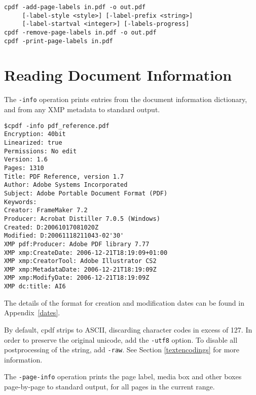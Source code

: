 \documentclass{book}
\begin{document}
\begin{framed}
    \vspace{1.5mm}
    \small\noindent\verb!cpdf -add-page-labels in.pdf -o out.pdf!\\
    \noindent\verb!     [-label-style <style>] [-label-prefix <string>]!\\
    \noindent\verb!     [-label-startval <integer>] [-labels-progress]!\\
    
    \vspace{1.5mm}
    \small\noindent\verb!cpdf -remove-page-labels in.pdf -o out.pdf!\\
    \small\noindent\verb!cpdf -print-page-labels in.pdf!
  \end{framed}
 
\section{Reading Document Information}
\label{info}
The \texttt{-info} operation prints entries from the document information
dictionary, and from any XMP metadata to standard output.

\begin{framed}
{\small\begin{verbatim}
$cpdf -info pdf_reference.pdf
Encryption: 40bit
Linearized: true
Permissions: No edit
Version: 1.6
Pages: 1310
Title: PDF Reference, version 1.7
Author: Adobe Systems Incorporated
Subject: Adobe Portable Document Format (PDF)
Keywords: 
Creator: FrameMaker 7.2
Producer: Acrobat Distiller 7.0.5 (Windows)
Created: D:20061017081020Z
Modified: D:20061118211043-02'30'
XMP pdf:Producer: Adobe PDF library 7.77
XMP xmp:CreateDate: 2006-12-21T18:19:09+01:00
XMP xmp:CreatorTool: Adobe Illustrator CS2
XMP xmp:MetadataDate: 2006-12-21T18:19:09Z
XMP xmp:ModifyDate: 2006-12-21T18:19:09Z
XMP dc:title: AI6\end{verbatim}}\end{framed}
\noindent The details of the format for creation and modification dates can be found in
Appendix~\ref{dates}.

By default, cpdf strips to ASCII, discarding character codes in excess of 127. In order to preserve the original unicode, add the \texttt{-utf8} option. To disable all postprocessing of the string, add \texttt{-raw}. See Section \ref{textencodings} for more information.

\vspace{4mm}
The \texttt{-page-info} operation prints the page label, media box and other boxes
page-by-page to standard output, for all pages in the current range.
\end{document}
